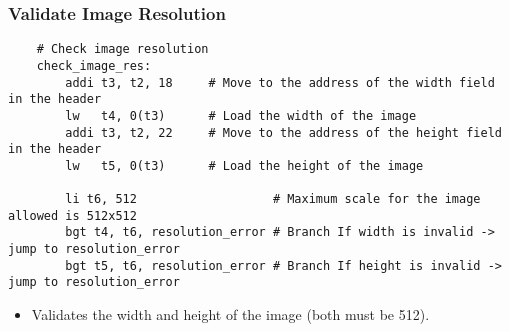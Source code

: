 \documentclass{article}
\begin{document}
\subsubsection{Validate Image Resolution}
\begin{verbatim}
    # Check image resolution
    check_image_res:
        addi t3, t2, 18     # Move to the address of the width field in the header
        lw   t4, 0(t3)      # Load the width of the image
        addi t3, t2, 22     # Move to the address of the height field in the header
        lw   t5, 0(t3)      # Load the height of the image
    
        li t6, 512                   # Maximum scale for the image allowed is 512x512
        bgt t4, t6, resolution_error # Branch If width is invalid -> jump to resolution_error 
        bgt t5, t6, resolution_error # Branch If height is invalid -> jump to resolution_error
\end{verbatim}
\begin{itemize}
    \item Validates the width and height of the image (both must be 512).
\end{itemize}
\end{document}
